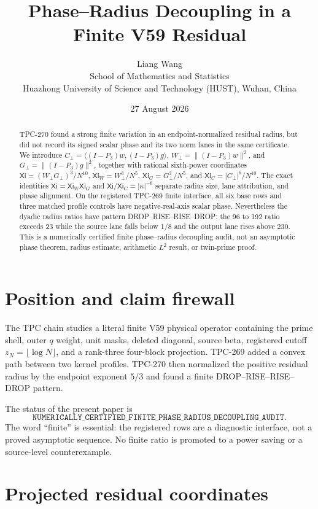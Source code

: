 \documentclass[11pt]{article}
\title{Phase--Radius Decoupling in a Finite V59 Residual}
\author{Liang Wang\\
School of Mathematics and Statistics\\
Huazhong University of Science and Technology (HUST), Wuhan, China}
\date{27 August 2026}
\newcommand{\XiN}{\mathsf{Xi}}
\newcommand{\Xiw}{\mathsf{Xi}_{W}}
\newcommand{\Xig}{\mathsf{Xi}_{G}}
\newcommand{\Xic}{\mathsf{Xi}_{C}}
\newcommand{\Cp}{C_{\perp}}
\newcommand{\Wp}{W_{\perp}}
\newcommand{\Gp}{G_{\perp}}
\begin{document}
\maketitle

\begin{abstract}
TPC-270 found a strong finite variation in an endpoint-normalized residual
radius, but did not record its signed scalar phase and its two norm lanes in
the same certificate.  We introduce
\(\Cp=\langle(I-P_3)w,(I-P_3)g\rangle\), \(\Wp=\|(I-P_3)w\|^2\), and
\(\Gp=\|(I-P_3)g\|^2\), together with rational sixth-power coordinates
\(\XiN=(\Wp\Gp)^3/N^{10}\), \(\Xiw=\Wp^3/N^5\),
\(\Xig=\Gp^3/N^5\), and \(\Xic=|\Cp|^6/N^{10}\).  The exact identities
\(\XiN=\Xiw\Xig\) and \(\XiN/\Xic=|\kappa|^{-6}\) separate radius size,
lane attribution, and phase alignment.  On the registered TPC-269 finite
interface, all six base rows and three matched profile controls have
negative-real-axis scalar phase.  Nevertheless the dyadic radius ratios have
pattern DROP--RISE--RISE--DROP; the 96 to 192 ratio exceeds 23 while the
source lane falls below 1/8 and the output lane rises above 230.  This is a
numerically certified finite phase--radius decoupling audit, not an asymptotic
phase theorem, radius estimate, arithmetic $L^2$ result, or twin-prime proof.
\end{abstract}

\section{Position and claim firewall}

The TPC chain studies a literal finite V59 physical operator containing the
prime shell, outer $q$ weight, unit masks, deleted diagonal, source beta,
registered cutoff $z_N=\lfloor\log N\rfloor$, and a rank-three four-block
projection.  TPC-269 added a convex path between two kernel profiles.  TPC-270
then normalized the positive residual radius by the endpoint exponent $5/3$
and found a finite DROP--RISE--RISE--DROP pattern.

The status of the present paper is
\[
\texttt{NUMERICALLY\_CERTIFIED\_FINITE\_PHASE\_RADIUS\_DECOUPLING\_AUDIT}.
\]
The word ``finite'' is essential: the registered rows are a diagnostic
interface, not a proved asymptotic sequence.  No finite ratio is promoted to a
power saving or a source-level counterexample.

\section{Projected residual coordinates}
\end{document}

